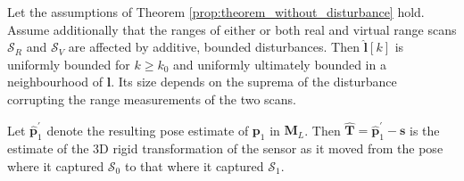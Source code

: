 \begin{theorem}
  \label{prop:theorem_with_disturbance} Let the assumptions of Theorem
  \ref{prop:theorem_without_disturbance} hold. Assume additionally that the
  ranges of either or both real and virtual range scans $\mathcal{S}_R$ and
  $\mathcal{S}_V$ are affected by additive, bounded disturbances. Then
  $\hat{\bm{l}}[k]$ is uniformly bounded for $k \geq k_0$ and uniformly
  ultimately bounded in a neighbourhood of $\bm{l}$. Its size depends on the
  suprema of the disturbance corrupting the range measurements of the two
  scans.
\end{theorem}

Let $\hat{\bm{p}}_1^\prime$ denote the resulting pose estimate of $\bm{p}_1$
in $\bm{M}_L$. Then $\hat{\bm{T}} = \hat{\bm{p}}_1^\prime - \bm{s}$ is the
estimate of the 3D rigid transformation of the sensor as it moved from the pose
where it captured $\mathcal{S}_0$ to that where it captured $\mathcal{S}_1$.
